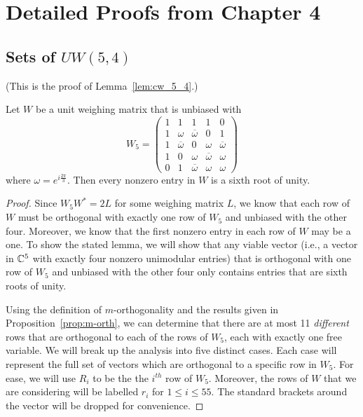 \chapter[Detailed Proofs from Chapter 4]{Detailed Proofs from Chapter 4}
\label{app:ch4-cases}

\section[Sets of \texorpdfstring{$UW(5,4)$}{UW(5,4)}]{Sets of \texorpdfstring{$UW(5,4)$}{UW(5,4)}}
\label{app:uw54}

(This is the proof of Lemma~\ref{lem:cw_5_4}.)

\begin{lemma}\label{lem-proof:cw_5_4}
 Let $W$ be a unit weighing matrix that is unbiased with 
$$
W_5 = \left(
\begin{array}{ccccc}
 1 & 1            &1            &1            &0 \\
 1 & \omega            &\overline{\omega} &0            &1 \\
 1 & \overline{\omega} &0            &\omega            &\overline{\omega} \\
 1 & 0            &\omega            &\overline{\omega} &\omega \\
 0 & 1            &\overline{\omega} &\omega            &\omega
\end{array}
\right)
$$
where $\omega = e^{i\frac{2\pi}{3}}$. Then every nonzero entry in $W$ is a sixth root of unity.

 \begin{proof}
  Since $W_5W^* = 2L$ for some weighing matrix $L$, we know that each row of $W$ must be orthogonal with exactly one row of $W_5$ and unbiased with the other four. Moreover, we know that the first nonzero entry in each row of $W$ may be a one. To show the stated lemma, we will show that any viable vector (i.e., a vector in $\mathbb{C}^5$ with exactly four nonzero unimodular entries) that is orthogonal with one row of $W_5$ and unbiased with the other four only contains entries that are sixth roots of unity.

  Using the definition of $m$-orthogonality and the results given in Proposition~\ref{prop:m-orth}, we can determine that there are at most 11 {\it different} rows that are orthogonal to each of the rows of $W_5$, each with exactly one free variable. We will break up the analysis into five distinct cases. Each case will represent the full set of vectors which are orthogonal to a specific row in $W_5$. For ease, we will use $R_i$ to be the the $i^{th}$ row of $W_5$. Moreover, the rows of $W$ that we are considering will be labelled $r_i$ for $1 \leq i \leq 55$. The standard brackets around the vector will be dropped for convenience.


\end{proof}
\end{lemma}
